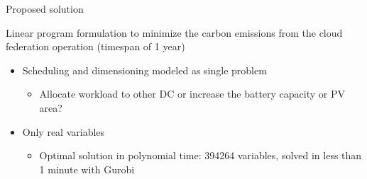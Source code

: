 \documentclass[Ligatures=TeX,table,svgnames,usetotalslideindicator,compress,10pt]{beamer}
\begin{document}
\begin{frame}{Proposed solution}
 
  Linear program formulation to minimize the carbon emissions from the cloud federation operation (timespan of 1 year) \footnotemark[2]
  
  \begin{itemize}
    
  \item Scheduling and dimensioning modeled as single problem
    \begin{itemize}
      
    \item Allocate workload to other DC or increase the battery capacity or PV area?
    \end{itemize}
    
  \item Only real variables 
    \begin{itemize}     
    \item  \alert{Optimal} solution in \alert{polynomial time}: 394264 variables, solved in less than \alert{1 minute} with Gurobi

    \end{itemize}

  \end{itemize}
  
  
  
\end{frame}
\end{document}
